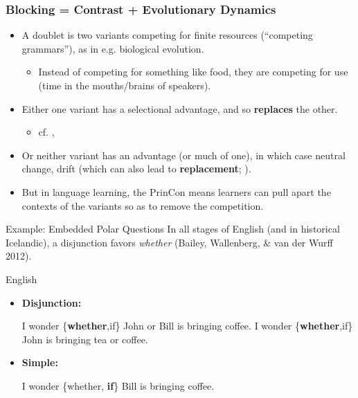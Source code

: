 \documentclass[hyperref={pdfpagelabels=false}]{beamer}
\begin{document}
\begin{frame}
\frametitle{Blocking = Contrast + Evolutionary Dynamics}
\begin{itemize}
	\item A doublet is two variants competing for finite resources (``competing grammars''), as in e.g. biological evolution.
		\begin{itemize} 
			\item Instead of competing for something like food, they are competing for use (time in the mouths/brains of speakers). 
			

			\end{itemize}
	\item Either one variant has a selectional advantage, and so \textbf{replaces} the other. 	
	\begin{itemize} \item \small{cf. \citet[][and subs.]{yang2000}, \citet{heycockwallenberg2013}}

			\end{itemize}
	\item Or neither variant has an advantage (or much of one), in which case neutral change, drift (which can also lead to \textbf{replacement}; \citealt{kauhanen2016}).
	

	\item But in language learning, the PrinCon means learners can pull apart the contexts of the variants so as to remove the competition.
\end{itemize}
\end{frame}


\begin{frame}{Example: Embedded Polar Questions}
		In all stages of English (and in historical Icelandic), a disjunction favors {\it whether} (Bailey, Wallenberg, \& van der Wurff 2012). \nocite{baileywallenbergwurff2012}
	\begin{block}{English}
		\begin{itemize}
		\item[ ]\textbf{Disjunction:}
		\begin{exe}
			\ex I wonder \{{\bf whether},if\} John or Bill is bringing coffee.
			\ex I wonder \{{\bf whether},if\} John is bringing tea or coffee.
		\end{exe}
		\item[ ]\textbf{Simple:}
		\begin{exe}
			\ex I wonder \{whether, {\bf if}\} Bill is bringing coffee.
		\end{exe}
		\end{itemize}
	
	\end{block}
\end{frame}
\end{document}
